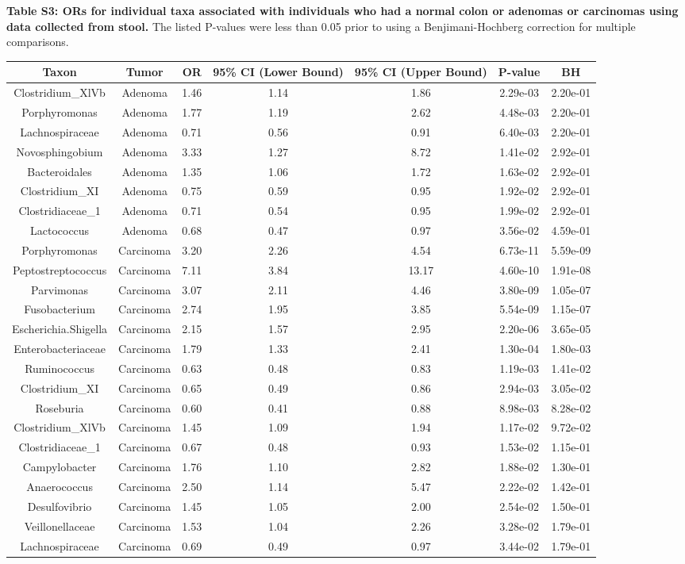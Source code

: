 \documentclass[12pt,]{article}
\begin{document}
\newpage

\textbf{Table S3: ORs for individual taxa associated with individuals
who had a normal colon or adenomas or carcinomas using data collected
from stool.} The listed P-values were less than 0.05 prior to using a
Benjimani-Hochberg correction for multiple comparisons.

\footnotesize

\begin{longtable}[]{@{}ccccccc@{}}
\toprule
Taxon & Tumor & OR & 95\% CI (Lower Bound) & 95\% CI (Upper Bound) &
P-value & BH\tabularnewline
\midrule
\endhead
Clostridium\_XlVb & Adenoma & 1.46 & 1.14 & 1.86 & 2.29e-03 &
2.20e-01\tabularnewline
Porphyromonas & Adenoma & 1.77 & 1.19 & 2.62 & 4.48e-03 &
2.20e-01\tabularnewline
Lachnospiraceae & Adenoma & 0.71 & 0.56 & 0.91 & 6.40e-03 &
2.20e-01\tabularnewline
Novosphingobium & Adenoma & 3.33 & 1.27 & 8.72 & 1.41e-02 &
2.92e-01\tabularnewline
Bacteroidales & Adenoma & 1.35 & 1.06 & 1.72 & 1.63e-02 &
2.92e-01\tabularnewline
Clostridium\_XI & Adenoma & 0.75 & 0.59 & 0.95 & 1.92e-02 &
2.92e-01\tabularnewline
Clostridiaceae\_1 & Adenoma & 0.71 & 0.54 & 0.95 & 1.99e-02 &
2.92e-01\tabularnewline
Lactococcus & Adenoma & 0.68 & 0.47 & 0.97 & 3.56e-02 &
4.59e-01\tabularnewline
Porphyromonas & Carcinoma & 3.20 & 2.26 & 4.54 & 6.73e-11 &
5.59e-09\tabularnewline
Peptostreptococcus & Carcinoma & 7.11 & 3.84 & 13.17 & 4.60e-10 &
1.91e-08\tabularnewline
Parvimonas & Carcinoma & 3.07 & 2.11 & 4.46 & 3.80e-09 &
1.05e-07\tabularnewline
Fusobacterium & Carcinoma & 2.74 & 1.95 & 3.85 & 5.54e-09 &
1.15e-07\tabularnewline
Escherichia.Shigella & Carcinoma & 2.15 & 1.57 & 2.95 & 2.20e-06 &
3.65e-05\tabularnewline
Enterobacteriaceae & Carcinoma & 1.79 & 1.33 & 2.41 & 1.30e-04 &
1.80e-03\tabularnewline
Ruminococcus & Carcinoma & 0.63 & 0.48 & 0.83 & 1.19e-03 &
1.41e-02\tabularnewline
Clostridium\_XI & Carcinoma & 0.65 & 0.49 & 0.86 & 2.94e-03 &
3.05e-02\tabularnewline
Roseburia & Carcinoma & 0.60 & 0.41 & 0.88 & 8.98e-03 &
8.28e-02\tabularnewline
Clostridium\_XlVb & Carcinoma & 1.45 & 1.09 & 1.94 & 1.17e-02 &
9.72e-02\tabularnewline
Clostridiaceae\_1 & Carcinoma & 0.67 & 0.48 & 0.93 & 1.53e-02 &
1.15e-01\tabularnewline
Campylobacter & Carcinoma & 1.76 & 1.10 & 2.82 & 1.88e-02 &
1.30e-01\tabularnewline
Anaerococcus & Carcinoma & 2.50 & 1.14 & 5.47 & 2.22e-02 &
1.42e-01\tabularnewline
Desulfovibrio & Carcinoma & 1.45 & 1.05 & 2.00 & 2.54e-02 &
1.50e-01\tabularnewline
Veillonellaceae & Carcinoma & 1.53 & 1.04 & 2.26 & 3.28e-02 &
1.79e-01\tabularnewline
Lachnospiraceae & Carcinoma & 0.69 & 0.49 & 0.97 & 3.44e-02 &
1.79e-01\tabularnewline
\bottomrule
\end{longtable}
\end{document}
